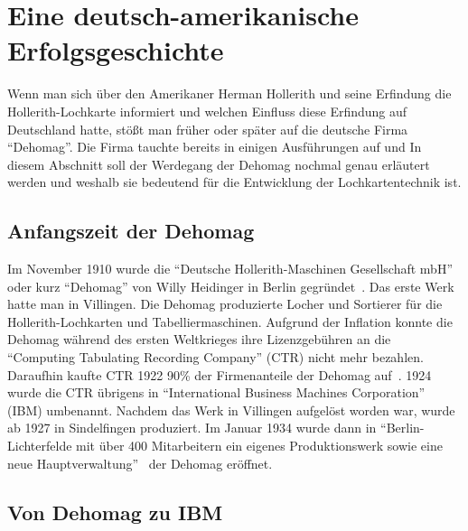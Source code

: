 \documentclass[parskip=half]{scrartcl}
\begin{document}
\section{Eine deutsch-amerikanische Erfolgsgeschichte}

Wenn man sich über den Amerikaner Herman Hollerith und seine Erfindung die
Hollerith-Lochkarte informiert und welchen Einfluss diese Erfindung auf
Deutschland hatte, stößt man früher oder später auf die deutsche Firma
\enquote{Dehomag}. Die Firma tauchte bereits in einigen Ausführungen auf und In
diesem Abschnitt soll der Werdegang der Dehomag nochmal genau erläutert werden
und weshalb sie bedeutend für die Entwicklung der Lochkartentechnik ist.

\subsection{Anfangszeit der Dehomag}

Im November 1910 wurde die \enquote{Deutsche Hollerith-Maschinen Gesellschaft
mbH} oder kurz \enquote{Dehomag} von Willy Heidinger in Berlin
gegründet~\cite{dingwerth}. Das erste Werk hatte man in Villingen. Die Dehomag
produzierte Locher und Sortierer für die Hollerith-Lochkarten und
Tabelliermaschinen. Aufgrund der Inflation konnte die Dehomag während des
ersten Weltkrieges ihre Lizenzgebühren an die \enquote{Computing Tabulating
Recording Company} (CTR) nicht mehr bezahlen.  Daraufhin kaufte CTR 1922 90\%
der Firmenanteile der Dehomag auf~\cite{restloseErfassung}. 1924 wurde die CTR
übrigens in \enquote{International Business Machines Corporation} (IBM)
umbenannt. Nachdem das Werk in Villingen aufgelöst worden war, wurde ab 1927 in
Sindelfingen produziert. Im Januar 1934 wurde dann in
\enquote{Berlin-Lichterfelde mit über 400 Mitarbeitern ein eigenes
Produktionswerk sowie eine neue Hauptverwaltung}~\cite{dingwerth} der Dehomag
eröffnet.

\subsection{Von Dehomag zu IBM}
\end{document}
